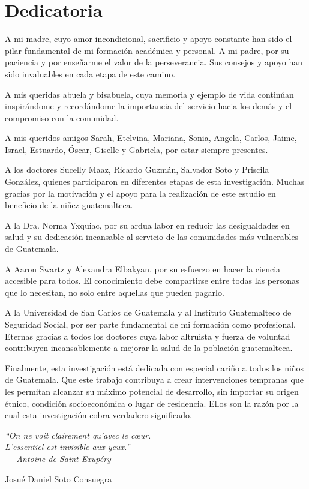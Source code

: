\chapter*{Dedicatoria}
A mi madre, cuyo amor incondicional, sacrificio y apoyo constante han sido el 
pilar fundamental de mi formación académica y personal. A mi padre, por su 
paciencia y por enseñarme el valor de la perseverancia. Sus consejos y apoyo 
han sido invaluables en cada etapa de este camino.

A mis queridas abuela y bisabuela, cuya memoria y ejemplo de vida continúan 
inspirándome y recordándome la importancia del servicio hacia los demás y el 
compromiso con la comunidad.

A mis queridos amigos Sarah, Etelvina, Mariana, Sonia, Angela, Carlos, Jaime, 
Israel, Estuardo, Óscar, Giselle y Gabriela, por estar siempre presentes.

A los doctores Sucelly Maaz, Ricardo Guzmán, Salvador Soto y Priscila González, 
quienes participaron en diferentes etapas de esta investigación. Muchas gracias 
por la motivación y el apoyo para la realización de este estudio en beneficio 
de la niñez guatemalteca.

A la Dra. Norma Yxquiac, por su ardua labor en reducir las desigualdades en 
salud y su dedicación incansable al servicio de las comunidades más vulnerables 
de Guatemala.

A Aaron Swartz y Alexandra Elbakyan, por su esfuerzo en hacer la ciencia 
accesible para todos. El conocimiento debe compartirse entre todas las personas 
que lo necesitan, no solo entre aquellas que pueden pagarlo.

A la Universidad de San Carlos de Guatemala y al Instituto Guatemalteco de 
Seguridad Social, por ser parte fundamental de mi formación como profesional. 
Eternas gracias a todos los doctores cuya labor altruista y fuerza de voluntad 
contribuyen incansablemente a mejorar la salud de la población guatemalteca.

Finalmente, esta investigación está dedicada con especial cariño a todos los 
niños de Guatemala. Que este trabajo contribuya a crear intervenciones tempranas 
que les permitan alcanzar su máximo potencial de desarrollo, sin importar su 
origen étnico, condición socioeconómica o lugar de residencia. Ellos son la 
razón por la cual esta investigación cobra verdadero significado.

\vspace{1cm}

\begin{center}
\textit{``On ne voit clairement qu'avec le cœur. \\
L'essentiel est invisible aux yeux.''} \\
\textit{--- Antoine de Saint-Exupéry}
\end{center}

\vspace{1cm}

\begin{flushright}
Josué Daniel Soto Consuegra
\end{flushright}
